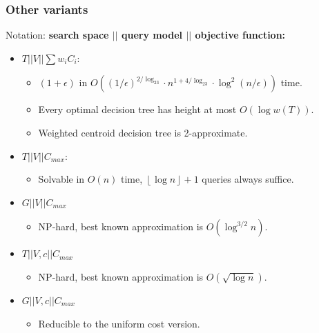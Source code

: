 \documentclass{beamer}
\newcommand{\br}[1]{\mathopen{}\left( #1 \right)}
\newcommand{\fl}[1]{\mathopen{}\left\lfloor #1 \right\rfloor}
\begin{document}
\begin{frame}
\frametitle{Other variants}
Notation: \textbf{search space $||$ query model $||$ objective function:}
    \pause
\begin{itemize}
    \item $T||V||\sum w_iC_i$:
    \begin{itemize}
        \item $\br{1+\epsilon}$ in
$O\br{\br{1/\epsilon}^{2/\log_23}\cdot n^{1+4/\log_23}\cdot \log^2\br{n/\epsilon}}$ time.
    \item Every optimal decision tree has height at most $O\br{\log w\br{T}}$.
    \item Weighted centroid decision tree is 2-approximate.
    \end{itemize}
    \pause
    \item $T||V|| C_{max}$:
    \begin{itemize}
        \item Solvable in $O\br{n}$ time, $\fl{\log n}+1$ queries always suffice.
    \end{itemize}
    \pause
    \item $G||V|| C_{max}$
    \begin{itemize}
        \item NP-hard, best known approximation is $O\br{\log^{3/2} n}$.
    \end{itemize}
    \pause
    \item $T||V, c|| C_{max}$
    \begin{itemize}
        \item NP-hard, best known approximation is $O\br{\sqrt{\log n}}$.
    \end{itemize}
    \pause
    \item $G||V, c|| C_{max}$
    \begin{itemize}
        \item Reducible to the uniform cost version.
    \end{itemize}
\end{itemize}
\end{frame}
\end{document}
